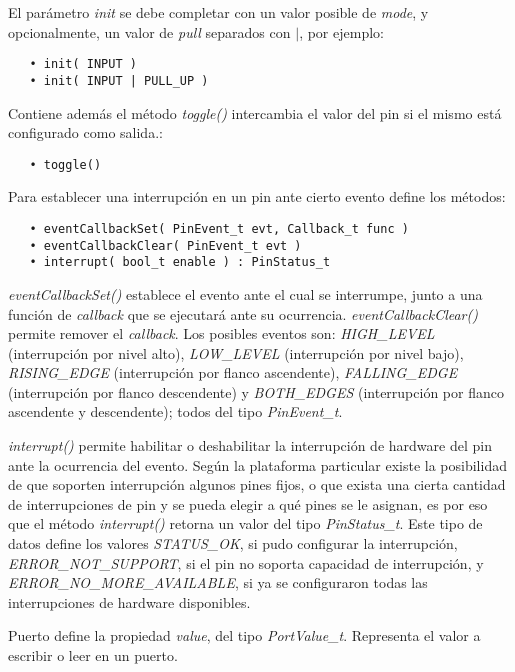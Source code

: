 El parámetro \emph{init} se debe completar con un valor posible de \emph{mode}, y opcionalmente, un valor de \emph{pull} separados con $|$, por ejemplo:

\begin{verbatim}
   • init( INPUT )
   • init( INPUT | PULL_UP )
\end{verbatim}

Contiene además el método \emph{toggle()} intercambia el valor del pin si el mismo está configurado como salida.:

\begin{verbatim}
   • toggle()
\end{verbatim}

Para establecer una interrupción en un pin ante cierto evento define los métodos: 

\begin{verbatim}
   • eventCallbackSet( PinEvent_t evt, Callback_t func )
   • eventCallbackClear( PinEvent_t evt )
   • interrupt( bool_t enable ) : PinStatus_t
 \end{verbatim} 

\emph{eventCallbackSet()} establece el evento ante el cual se interrumpe, junto a una función de \emph{callback} que se ejecutará ante su ocurrencia. \emph{eventCallbackClear()} permite remover el \emph{callback}. Los posibles eventos son: \emph{HIGH\_LEVEL} (interrupción por nivel alto), \emph{LOW\_LEVEL} (interrupción por nivel bajo), \emph{RISING\_EDGE} (interrupción por flanco ascendente), \emph{FALLING\_EDGE} (interrupción por flanco descendente) y \emph{BOTH\_EDGES} (interrupción por flanco ascendente y descendente); todos del tipo \emph{PinEvent\_t}.

\emph{interrupt()} permite habilitar o deshabilitar la interrupción de hardware del pin ante la ocurrencia del evento. Según la plataforma particular existe la posibilidad de que soporten interrupción algunos pines fijos, o que exista una cierta cantidad de interrupciones de pin y se pueda elegir a qué pines se le asignan, es por eso que el método \emph{interrupt()} retorna un valor del tipo \emph{PinStatus\_t}. Este tipo de datos define los valores \emph{STATUS\_OK}, si pudo configurar la interrupción, \emph{ERROR\_NOT\_SUPPORT}, si el pin no soporta capacidad de interrupción, y \emph{ERROR\_NO\_MORE\_AVAILABLE}, si ya se configuraron todas las interrupciones de hardware disponibles. 


Puerto define la propiedad \emph{value}, del tipo \emph{PortValue\_t}. Representa el valor a escribir o leer en un puerto.

